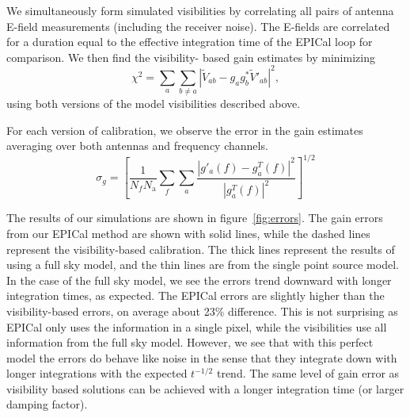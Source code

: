 \documentclass[a4paper,fleqn,usenatbib]{mnras}
\newcommand{\Nant}{\ensuremath{N_{\mathrm{a}}}}
\newcommand{\V}{\ensuremath{\widetilde{V}}}
\begin{document}
We simultaneously form simulated visibilities by correlating all pairs of antenna E-field 
measurements (including the receiver noise). The E-fields are correlated for a duration equal to 
the effective integration time of the EPICal loop for comparison. We then find the visibility-
based gain estimates by minimizing
\begin{equation}\label{eq:vis_cal}
\chi^2 = \sum_a\sum_{b\ne a} \left|\V_{ab}-g_a g_b^* \V'_{ab}\right|^2,
\end{equation}
using both versions of the model visibilities described above.

 For each version of calibration, we observe the error in the gain estimates averaging over both 
 antennas and frequency channels.
\begin{equation}\label{eq:gain_error}
\sigma_g = \left[\frac{1}{N_f \Nant} \sum_f \sum_a \frac{\left|g'_a(f)-g^T_a(f)\right|^2}{\left|g^T_a(f)\right|^2}\right]^{1/2}
\end{equation}

The results of our simulations are shown in figure~\ref{fig:errors}. The gain errors from our 
EPICal method are shown with solid lines, while the dashed lines represent the visibility-based 
calibration. The thick lines represent the results of using a full sky model, and the thin lines are 
from the single point source model.  In the case of the full sky model, we see the errors trend 
downward with longer integration times, as expected. The EPICal errors are slightly higher than 
the visibility-based errors, on average about 23\% difference. This is not surprising as EPICal 
only uses the information in a single pixel, while the visibilities use all information from the full 
sky model. However, we see that with this perfect model the errors do behave like noise
in the sense that they integrate down with longer integrations with the expected $t^{-1/2}$ 
trend. 
The same level of gain error as visibility based solutions can be achieved with a longer integration time (or larger damping 
factor).
\end{document}

